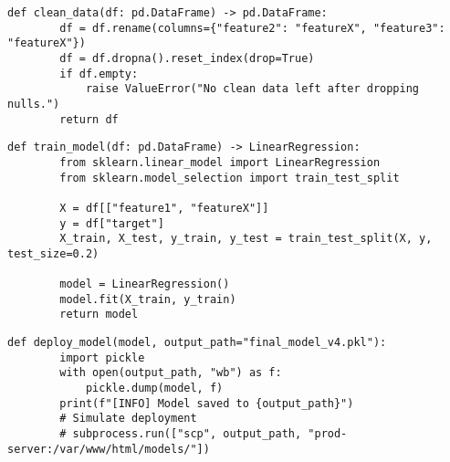 \begin{lstlisting}[caption={Clean and standardize the parsed DataFrame.}, label={lst:clean_data}]
    def clean_data(df: pd.DataFrame) -> pd.DataFrame:
        df = df.rename(columns={"feature2": "featureX", "feature3": "featureX"})
        df = df.dropna().reset_index(drop=True)
        if df.empty:
            raise ValueError("No clean data left after dropping nulls.")
        return df
\end{lstlisting}



\begin{lstlisting}[caption={Train a linear model using scikit-learn.}, label={lst:train_model}]
    def train_model(df: pd.DataFrame) -> LinearRegression:
        from sklearn.linear_model import LinearRegression
        from sklearn.model_selection import train_test_split
    
        X = df[["feature1", "featureX"]]
        y = df["target"]
        X_train, X_test, y_train, y_test = train_test_split(X, y, test_size=0.2)
    
        model = LinearRegression()
        model.fit(X_train, y_train)
        return model
\end{lstlisting}


\begin{lstlisting}[caption={Deploy the trained model by pickling it.}, label={lst:deploy_model}]
    def deploy_model(model, output_path="final_model_v4.pkl"):
        import pickle
        with open(output_path, "wb") as f:
            pickle.dump(model, f)
        print(f"[INFO] Model saved to {output_path}")
        # Simulate deployment
        # subprocess.run(["scp", output_path, "prod-server:/var/www/html/models/"])
\end{lstlisting}


